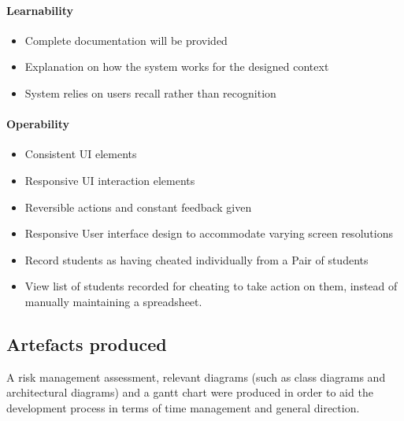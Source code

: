 \documentclass[11pt,a4paper]{article}
\begin{document}
\paragraph{Learnability}
\begin{itemize}
    \item Complete documentation will be provided
    \item Explanation on how the system works for the designed context
    \item System relies on users recall rather than recognition
\end{itemize}

\paragraph{Operability}
\begin{itemize}
    \item Consistent UI elements
    \item Responsive UI interaction elements
    \item Reversible actions and constant feedback given 
    \item Responsive User interface design to accommodate varying screen resolutions
    \item Record students as having cheated individually from a Pair of students
    \item View list of students recorded for cheating to take action on them, instead of manually maintaining a spreadsheet.
\end{itemize}

\subsection{Artefacts produced}

A risk management assessment, relevant diagrams (such as class diagrams and architectural diagrams) and a gantt chart were produced in order to aid the development process in terms of time management and general direction. 
\end{document}
